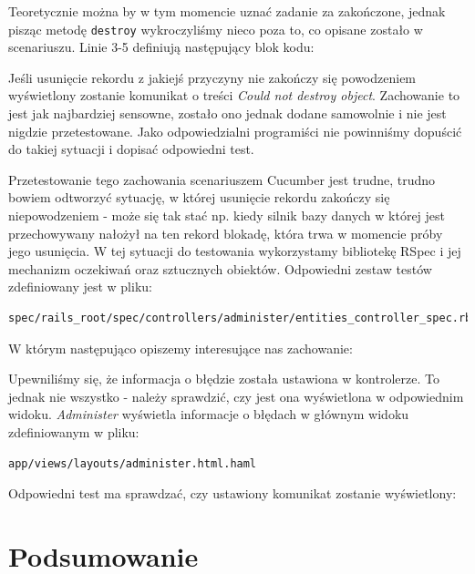  	Teoretycznie można by w tym momencie uznać zadanie za zakończone, jednak pisząc metodę \texttt{destroy} wykroczyliśmy nieco poza to, co opisane zostało w scenariuszu. Linie 3-5 definiują następujący blok kodu:
 	
 	
 	
 	Jeśli usunięcie rekordu z jakiejś przyczyny nie zakończy się powodzeniem wyświetlony zostanie komunikat o treści \emph{Could not destroy object}.
 	Zachowanie to jest jak najbardziej sensowne, zostało ono jednak dodane samowolnie i nie jest nigdzie przetestowane. Jako odpowiedzialni programiści nie powinniśmy dopuścić do takiej sytuacji i dopisać odpowiedni test. 
 	
 	Przetestowanie tego zachowania scenariuszem Cucumber jest trudne, trudno bowiem odtworzyć sytuację, w której usunięcie rekordu zakończy się niepowodzeniem - może się tak stać np. kiedy silnik bazy danych w której jest przechowywany nałożył na ten rekord blokadę, która trwa w momencie próby jego usunięcia. W tej sytuacji do testowania wykorzystamy bibliotekę RSpec i jej mechanizm oczekiwań oraz sztucznych obiektów. Odpowiedni zestaw testów zdefiniowany jest w pliku:
 	
\begin{lstlisting}
spec/rails_root/spec/controllers/administer/entities_controller_spec.rb
\end{lstlisting}
	
 	W którym następująco opiszemy interesujące nas zachowanie:
 	
 	
 	
 	Upewniliśmy się, że informacja o błędzie została ustawiona w kontrolerze. To jednak nie wszystko - należy sprawdzić, czy jest ona wyświetlona w odpowiednim widoku. \emph{Administer} wyświetla informacje o błędach w głównym widoku zdefiniowanym w pliku:
 	
\begin{lstlisting}
app/views/layouts/administer.html.haml
\end{lstlisting}
 	
 	Odpowiedni test ma sprawdzać, czy ustawiony komunikat zostanie wyświetlony:
 	
 	
  
  \section{Podsumowanie}
  

